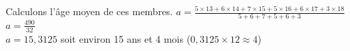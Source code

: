
Calculons l'âge moyen de ces membres.
	$a =\frac{5\times 13+6\times 14+7\times 15+5\times 16+6\times 17+3\times 18}{5+6+7+5+6+3}$\\  
	$a =\frac{490}{32}$\\ 
	$a = 15,3125$ \hspace{0.1cm}		soit environ 15 ans et 4 mois ($0,3125 \times 12 \approx 4$)\\